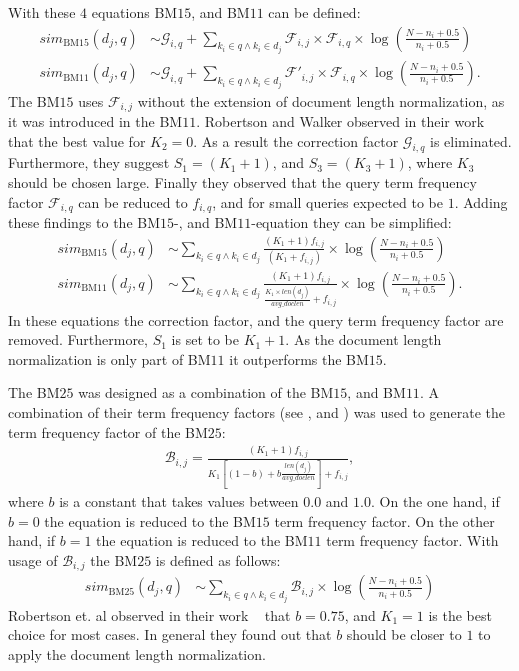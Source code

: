 With these $4$ equations BM$15$, and BM$11$ can be defined:
\begin{align}
  sim_{\text{BM$15$}}(d_j, q) & \sim \mathcal{G}_{i, q} + \sum_{k_i \in q \wedge k_i \in d_j} \mathcal{F}_{i, j}  \times \mathcal{F}_{i, q} \times \log \left(\frac{N - n_i + 0.5}{n_i + 0.5}\right) \\
  sim_{\text{BM$11$}}(d_j, q) & \sim \mathcal{G}_{i, q} + \sum_{k_i \in q \wedge k_i \in d_j} \mathcal{F}'_{i, j} \times \mathcal{F}_{i, q} \times \log \left(\frac{N - n_i + 0.5}{n_i + 0.5}\right).
\end{align}
The BM$15$ uses $\mathcal{F}_{i, j}$ without the extension of document length normalization, as it was introduced in the BM$11$. Robertson and Walker observed in their work ~\cite{RobertsonW94} that the best value for $K_2 = 0$. As a result the correction factor $\mathcal{G}_{i, q}$ is eliminated. Furthermore, they suggest $S_1 = (K_1 + 1)$, and $S_3 = (K_3 + 1)$, where $K_3$ should be chosen large. Finally they observed that the query term frequency factor $\mathcal{F}_{i, q}$ can be reduced to $f_{i, q}$, and for small queries expected to be $1$. Adding these findings to the BM$15$-, and BM$11$-equation they can be simplified:
\begin{align}
  sim_{\text{BM$15$}}(d_j, q) & \sim \sum_{k_i \in q \wedge k_i \in d_j} \frac{(K_1 + 1) f_{i, j}}{(K_1 + f_{i, j})} \times \log \left(\frac{N - n_i + 0.5}{n_i + 0.5}\right) \\
  sim_{\text{BM$11$}}(d_j, q) & \sim \sum_{k_i \in q \wedge k_i \in d_j} \frac{(K_1 + 1) f_{i, j}}{\frac{K_1 \times len(d_j)}{avg\_doclen} + f_{i, j}} \times \log \left(\frac{N - n_i + 0.5}{n_i + 0.5}\right).
\end{align}
In these equations the correction factor, and the query term frequency factor are removed. Furthermore, $S_1$ is set to be $K_1 + 1$. As the document length normalization is only part of BM$11$ it outperforms the BM$15$.

The BM$25$ was designed as a combination of the BM$15$, and BM$11$. A combination of their term frequency factors (see , and ) was used to generate the  term frequency factor of the BM$25$:
\begin{align}
  \mathcal{B}_{i, j} = \frac{(K_1 + 1) f_{i, j}}{K_1 \left[(1 - b) + b \frac{len(d_j)}{avg\_doclen} \right] + f_{i, j}},
\end{align}
where $b$ is a constant that takes values between $0.0$ and $1.0$. On the one hand, if $b = 0$ the equation is reduced to the BM$15$ term frequency factor. On the other hand, if $b = 1$ the equation is reduced to the BM$11$ term frequency factor. With usage of $\mathcal{B}_{i, j}$ the BM$25$ is defined as follows:
\begin{align}
  sim_{\text{BM$25$}}(d_j, q) & \sim \sum_{k_i \in q \wedge k_i \in d_j} \mathcal{B}_{i, j} \times \log \left(\frac{N - n_i + 0.5}{n_i + 0.5}\right)
\end{align}
Robertson et. al observed in their work ~\cite{RobertsonWJHG94} that $b = 0.75$, and $K_1 = 1$ is the best choice for most cases. In general they found out that $b$ should be closer to $1$ to apply the document length normalization. 

